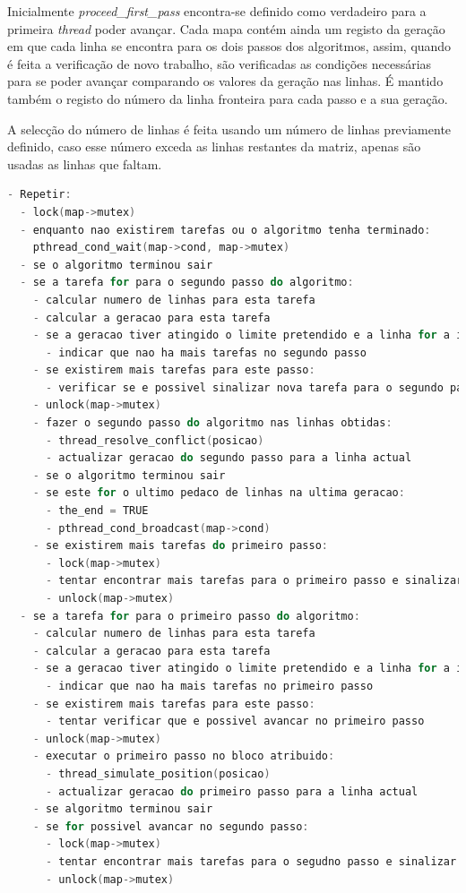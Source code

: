 \documentclass[12pt]{article}
\begin{document}
Inicialmente \textit{proceed\_first\_pass} encontra-se definido como verdadeiro para a primeira \textit{thread}
poder avançar. Cada mapa contém ainda um registo da geração em que cada linha se encontra para os dois passos
dos algoritmos, assim, quando é feita a verificação de novo trabalho, são verificadas as condições necessárias
para se poder avançar comparando os valores da geração nas linhas. É mantido também o registo
do número da linha fronteira para cada passo e a sua geração.

A selecção do número de linhas é feita usando um número de linhas previamente definido, caso
esse número exceda as linhas restantes da matriz, apenas são usadas as linhas que faltam.

\begin{lstlisting}[language=c,basicstyle=\footnotesize,frame=single,caption={Algoritmo paralelo.},label=algoritmo_paralelo]
- Repetir:
  - lock(map->mutex)
  - enquanto nao existirem tarefas ou o algoritmo tenha terminado:
    pthread_cond_wait(map->cond, map->mutex)
  - se o algoritmo terminou sair
  - se a tarefa for para o segundo passo do algoritmo:
    - calcular numero de linhas para esta tarefa
    - calcular a geracao para esta tarefa
    - se a geracao tiver atingido o limite pretendido e a linha for a inicial:
      - indicar que nao ha mais tarefas no segundo passo
    - se existirem mais tarefas para este passo:
      - verificar se e possivel sinalizar nova tarefa para o segundo passo do algoritmo
    - unlock(map->mutex)
    - fazer o segundo passo do algoritmo nas linhas obtidas:
      - thread_resolve_conflict(posicao)
      - actualizar geracao do segundo passo para a linha actual
    - se o algoritmo terminou sair
    - se este for o ultimo pedaco de linhas na ultima geracao:
      - the_end = TRUE
      - pthread_cond_broadcast(map->cond)
    - se existirem mais tarefas do primeiro passo:
      - lock(map->mutex)
      - tentar encontrar mais tarefas para o primeiro passo e sinalizar
      - unlock(map->mutex)
  - se a tarefa for para o primeiro passo do algoritmo:
    - calcular numero de linhas para esta tarefa
    - calcular a geracao para esta tarefa
    - se a geracao tiver atingido o limite pretendido e a linha for a inicial:
      - indicar que nao ha mais tarefas no primeiro passo
    - se existirem mais tarefas para este passo:
      - tentar verificar que e possivel avancar no primeiro passo
    - unlock(map->mutex)
    - executar o primeiro passo no bloco atribuido:
      - thread_simulate_position(posicao)
      - actualizar geracao do primeiro passo para a linha actual
    - se algoritmo terminou sair
    - se for possivel avancar no segundo passo:
      - lock(map->mutex)
      - tentar encontrar mais tarefas para o segudno passo e sinalizar
      - unlock(map->mutex)
\end{lstlisting}
\end{document}
